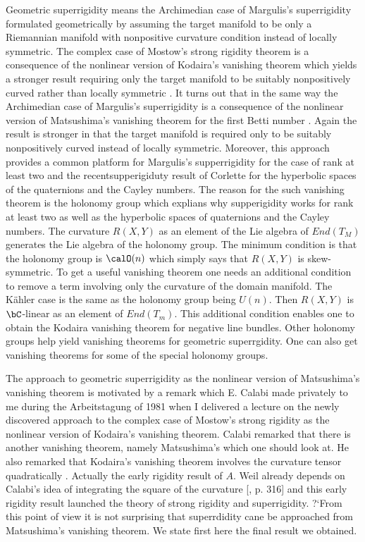 Geometric superrigidity means the Archimedian case of Margulis's superrigidity \cite{art16-keyMar} formulated geometrically by assuming the target manifold to be only a Riemannian manifold with nonpositive curvature condition instead of locally symmetric. The complex case of Mostow's strong rigidity theorem \cite{art16-keyMos} is a consequence of the nonlinear version of Kodaira's vanishing theorem which yields a stronger result requiring only the target manifold to be suitably nonpositively curved rather than locally symmetric \cite{art16-keySi}. It turns out that in the same way the Archimedian case of Margulis's superrigidity is a consequence of the nonlinear version of Matsushima's vanishing theorem for the first Betti number \cite{art16-keyMat}. Again the result is stronger in that the target manifold is required only to be suitably nonpositively curved instead of locally symmetric. Moreover, this approach provides a common platform for Margulis's supperrigidity for the case of rank at least two and the recentsupperigiduty result of Corlette \cite{art16-keyCo} for the hyperbolic spaces of the quaternions and the Cayley numbers. The reason for the such vanishing theorem is the holonomy group which explians why supperigidity works for rank at least two as well as the hyperbolic spaces of quaternions and the Cayley numbers. The curvature $R(X, Y)$ as an element of the Lie algebra of $End(T_{M})$ generates the Lie algebra of the holonomy group. The minimum condition is that the holonomy group is $\calO(n)$ which simply says that $R(X, Y)$ is skew-symmetric. To get a useful vanishing theorem one needs an additional condition to remove a term involving only the curvature of the domain manifold. The K\"ahler case is the same as the holonomy group being $U(n)$. Then $R(X, Y)$ is $\bC$-linear as an element of $End(T_{m})$. This additional condition enables one to obtain the Kodaira vanishing theorem for negative line bundles. Other holonomy groups help yield vanishing theorems for geometric superrgidity. One can also get vanishing theorems for some of the special holonomy groups.

The approach to geometric superrigidity as the nonlinear version of Matsushima's vanishing theorem is motivated by a remark which E.  Calabi made privately to me during the Arbeitstagung of 1981 when I delivered a lecture on the newly discovered approach to the complex case of Mostow's strong rigidity as the nonlinear version of Kodaira's vanishing theorem. Calabi remarked that there is another vanishing theorem, namely Matsushima's which one should look at. He also remarked that Kodaira's vanishing theorem involves the curvature tensor quadratically \cite{art16-keyCa}. Actually the early rigidity result of $A$. Weil \cite{art16-keyW} already depends on Calabi's idea of integrating the square of the
curvature [\cite{art16-keyMat}, p. 316] and this early rigidity result launched the theory of strong rigidity and superrigidity. ?`From this point of view it is not surprising that superrdidity cane be approached from Matsushima's vanishing theorem. We state first here the final result we obtained.


